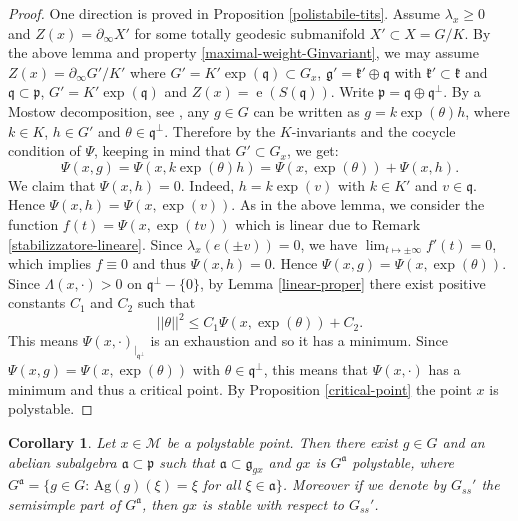 \documentclass[leqno,11pt, a4]{amsart}
\newtheorem{cor}[equation]{Corollary}
\theoremstyle{named}
\begin{document}
\begin{proof}
One direction is proved in Proposition \ref{polistabile-tits}. Assume ${\lambda}_x \geq 0$ and $Z(x) = \partial_\infty X'$ for some totally geodesic submanifold $X'\subset X=G/K$.
By the above lemma and property \eqref{maximal-weight-Ginvariant}, we may assume $Z(x)=\partial_\infty G'/K'$ where $G'=K'\exp({\mathfrak{q}})\subset G_x$, ${\mathfrak{g}}'={\mathfrak{k}}'\oplus {\mathfrak{q}}$ with ${\mathfrak{k}}' \subset {\mathfrak{k}}$ and ${\mathfrak{q}}\subset {\mathfrak{p}}$, $G'=K'\exp ({\mathfrak{q}})$ and
$Z(x)={\operatorname{e}} (S({\mathfrak{q}}))$.
Write ${\mathfrak{p}}={\mathfrak{q}} \oplus {\mathfrak{q}}^\perp$. By a Mostow decomposition, see \cite[Th. 9.3 p. 211]{heinzner-schwarz-Cartan}, any $g\in G$ can be written as $g=k\exp(\theta)h$, where $k\in K$, $h\in G'$ and $\theta \in {\mathfrak{q}}^\perp$. Therefore by the $K$-invariants and the cocycle condition of $\Psi$, keeping in mind that $G'\subset G_x$, we get:
\[
\Psi(x,g)=\Psi(x,k\exp(\theta)h)=\Psi(x,\exp(\theta))+\Psi(x,h).
\]
We claim that $\Psi(x,h)=0$. Indeed, $h=k \exp(v)$ with $k\in K'$ and $v\in {\mathfrak{q}}$. Hence  $\Psi(x,h)=\Psi(x,\exp(v))$. As in the above lemma, we consider the function
$
f(t)=\Psi(x,\exp(tv))
$
which is linear due to Remark \ref{stabilizzatore-lineare}. Since ${\lambda}_x(e(\pm v))=0$, we have $\lim_{t\mapsto \pm \infty} f'(t)=0$, which implies $f\equiv 0$ and thus $\Psi(x,h)=0$. Hence
$
\Psi(x,g)=\Psi(x,\exp(\theta)).
$
Since $\Lambda(x,\cdot) >0$ on ${\mathfrak{q}}^\perp{-} \{0\}$, by Lemma \ref{linear-proper}  there exist positive constants $C_1$ and $C_2$ such that
\[
|| \theta ||^2 \leq C_1\Psi(x,\exp(\theta))+C_2.
\]
This means $\Psi(x,\cdot)_{|_{{\mathfrak{q}}^\perp}}$ is an exhaustion and so it has a minimum. Since $\Psi(x,g)=\Psi(x, \exp(\theta))$ with $\theta\in {\mathfrak{q}}^\perp$, this means that $\Psi(x,\cdot)$ has a minimum and thus a critical point. By Proposition \ref{critical-point} the point $x$ is polystable.
\end{proof}
\begin{cor}\label{cor-polystable}
Let $x\in {\mathscr{M}}$ be a polystable point. Then there exist $g\in G$ and an abelian subalgebra ${\mathfrak{a}} \subset {\mathfrak{p}}$ such that ${\mathfrak{a}}\subset {\mathfrak{g}}_{gx}$ and $gx$ is $G^{\mathfrak{a}}$ polystable, where $G^{\mathfrak{a}}=\{g\in G:\, \mathrm{Ag}(g)(\xi)=\xi $ for all $\xi \in {\mathfrak{a}}\}$. Moreover
if we denote by $G_{ss}'$ the semisimple part of $G^{\mathfrak{a}}$, then $gx$ is stable with respect to $G_{ss}'$.
\end{cor}
\end{document}
